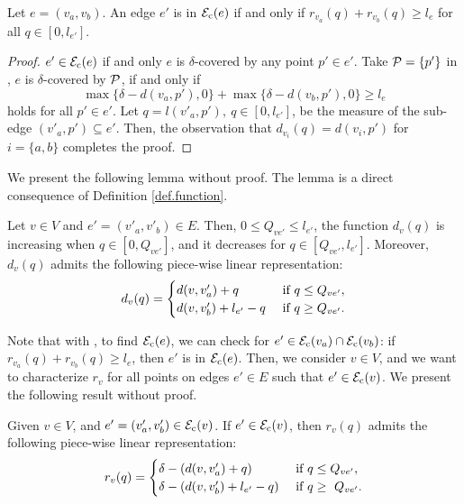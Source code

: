 \begin{lemma} \label{lem.covercE}
Let $e=(v_a,v_b)$. An edge $e'$ is in ${\mathcal E}_{\mathrm{c}}(e)$ if and only if $ r_{v_a}(q)+r_{v_b}(q)\geq l_e$ for all $q\in [0,l_{e'}]$.
\end{lemma}
\begin{proof}
$e' \in {\mathcal E}_{\mathrm{c}}(e)$ if and only $e$ is $\delta$-covered by any point $p' \in e'$.
Take $\mathcal P = \{p'\}$ in , $e$ is $\delta$-covered by $\mathcal P$, if and only if
 \begin{equation*}
 \max\{\delta -  d(v_a,p'),0\} +  \max\{\delta -  d(v_b,p'),0\} \geq l_e
\end{equation*}
holds for all $p'\in e'$. Let $q=l(v'_a,p'),\: q \in [0, l_{e'}]$, be the measure of the sub-edge $(v'_a,p')\subseteq e'$. Then, the observation that $d_{v_i}(q)=d(v_i,p')$ for $i=\{a,b\}$ completes the proof.
\end{proof}

We present the following lemma without proof. The lemma is a direct consequence of Definition \ref{def.function}.
\begin{lemma}\label{lem.pieces}
Let $v\in V$ and $e'=(v'_a,v'_b)\in E$. Then, $0 \le Q_{ve'} \le l_{e'}$, the function $d_v(q)$ is increasing when $q\in [0, Q_{ve'}]$, and it decreases for $q\in[Q_{ve'}, l_{e'}]$. Moreover, $d_v(q)$ admits the following piece-wise linear representation:
\begin{equation*}
	d_v(q) = \begin{cases}
	d(v,v'_a)+q & \textup{ if }q \le Q_{ve'}, \\
	d(v,v'_b)+l_{e'}-q & \textup{ if }q \ge Q_{ve'}. \\   
	\end{cases}
\end{equation*}
\end{lemma}

Note that with  , to find ${\mathcal E}_{\mathrm{c}}(e)$, we can check  for $e' \in {\mathcal E}_{\mathrm{c}}(v_a) \cap {\mathcal E}_{\mathrm{c}}(v_b)$: if $ r_{v_a}(q)+r_{v_b}(q)\geq l_e$, then $e'$ is in  ${\mathcal E}_{\mathrm{c}}(e)$. Then, we consider $v \in V$, and we want to characterize $r_v$ for all points on edges $e'\in E$ such that $e' \in {\mathcal E}_{\mathrm{c}}(v)$. We present the following result without proof.


\begin{lemma}
Given $v \in V$, and $e'=(v'_a,v'_b) \in {\mathcal E}_{\mathrm{c}}(v)$. If $e'\in {\mathcal E}_{\mathrm{c}}(v)$, then $r_v(q)$ admits the following piece-wise linear representation:
\begin{equation*}
	r_v(q) = \begin{cases}
	\delta - (d(v,v'_a) + q) & \textup{ if }q \le Q_{ve'}, \\
	\delta- (d(v,v'_b)+l_{e'}-q) & \textup{ if }q \ge \ Q_{ve'}. \\   
	\end{cases}
\end{equation*}
\end{lemma}

